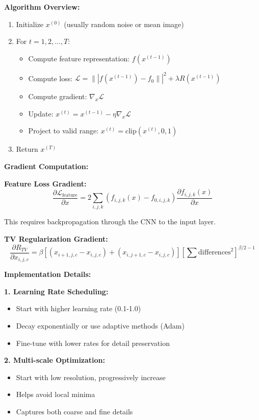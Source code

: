 \documentclass[12pt]{article}
\begin{document}
\begin{enumerate}[(a)]
{    \textbf{Algorithm Overview:}
    \begin{enumerate}
        \item Initialize $x^{(0)}$ (usually random noise or mean image)
        \item For $t = 1, 2, ..., T$:
        \begin{itemize}
            \item Compute feature representation: $f(x^{(t-1)})$
            \item Compute loss: $\mathcal{L} = \||f(x^{(t-1)}) - f_0\||^2 + \lambda R(x^{(t-1)})$
            \item Compute gradient: $\nabla_x \mathcal{L}$
            \item Update: $x^{(t)} = x^{(t-1)} - \eta \nabla_x \mathcal{L}$
            \item Project to valid range: $x^{(t)} = \text{clip}(x^{(t)}, 0, 1)$
        \end{itemize}
        \item Return $x^{(T)}$
    \end{enumerate}
    
    \textbf{Gradient Computation:}
    
    \textbf{Feature Loss Gradient:}
    $$\frac{\partial \mathcal{L}_{\text{feature}}}{\partial x} = 2 \sum_{i,j,k} (f_{i,j,k}(x) - f_{0,i,j,k}) \frac{\partial f_{i,j,k}(x)}{\partial x}$$
    
    This requires backpropagation through the CNN to the input layer.
    
    \textbf{TV Regularization Gradient:}
    $$\frac{\partial R_{TV}}{\partial x_{i,j,c}} = \beta \left[(x_{i+1,j,c} - x_{i,j,c}) + (x_{i,j+1,c} - x_{i,j,c})\right] \left[\sum \text{differences}^2\right]^{\beta/2-1}$$
    
    \textbf{Implementation Details:}
    
    \textbf{1. Learning Rate Scheduling:}
    \begin{itemize}
        \item Start with higher learning rate (0.1-1.0)
        \item Decay exponentially or use adaptive methods (Adam)
        \item Fine-tune with lower rates for detail preservation
    \end{itemize}
    
    \textbf{2. Multi-scale Optimization:}
    \begin{itemize}
        \item Start with low resolution, progressively increase
        \item Helps avoid local minima
        \item Captures both coarse and fine details
    \end{itemize}
    
}
\end{enumerate}
\end{document}
